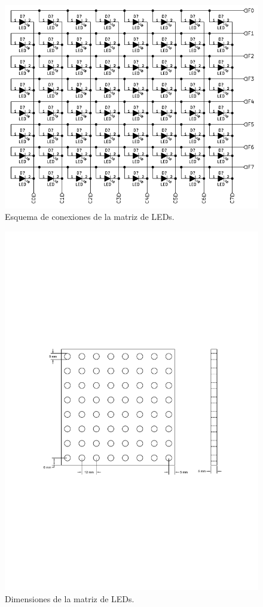 \begin{figure}[!ht]
	\centering
	\includegraphics[width=0.7\linewidth]{imagenes/hw/modulo-led.pdf}
	\caption{Esquema de conexiones de la matriz de LEDs.}
	\label{fig:modulo-led}
\end{figure}
\begin{figure}[!ht]
	\centering
	\includegraphics[width=\linewidth]{imagenes/hw/modulo-led-dimensiones.pdf}
	\caption{Dimensiones de la matriz de LEDs.}
	\label{fig:modulo-led-dimensiones}
\end{figure}


